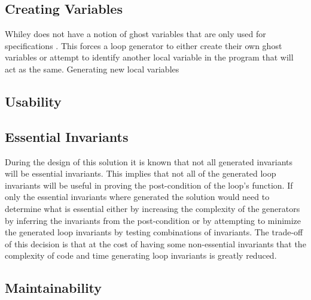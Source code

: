 \subsection{Creating Variables}
%

Whiley does not have a notion of ghost variables that are only used for
specifications \cite{whiley-origin}.
This forces a loop generator to either create their own ghost variables or
attempt to identify another local variable in the program that will act as the
same.
Generating new local variables 

\subsection{Usability}

\subsection{Essential Invariants}

During the design of this solution it is known that not all generated
invariants will be essential invariants.
This implies that not all of the generated loop invariants will be useful
in proving the post-condition of the loop's function.
If only the essential invariants where generated the solution would need
to determine what is essential either by increasing the complexity of the
generators by inferring the invariants from the post-condition or by 
attempting to minimize the generated loop invariants by testing combinations 
of invariants.
The trade-off of this decision is that at the cost of having some non-essential
invariants that the complexity of code and time generating loop invariants is
greatly reduced.

\subsection{Maintainability}

